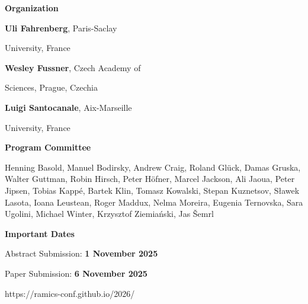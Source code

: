 \documentclass[a3paper, 12pt]{article}
\begin{document}
\begin{minipage}[t]{.43\linewidth}


  

  \vspace*{2ex}
  
  \hfill {\Large \bf Organization}

  \smallskip

  \hfill \textbf{Uli Fahrenberg}, Paris-Saclay

  \hfill University, France

  \hfill \textbf{Wesley Fussner}, Czech Academy of

  \hfill Sciences, Prague, Czechia

  \hfill \textbf{Luigi Santocanale}, Aix-Marseille

  \hfill University, France

  \bigskip

  \hfill {\Large \bf Program Committee}

  \medskip

Henning Basold,
Manuel Bodirsky,
Andrew Craig,
Roland Glück,
Damas Gruska,
Walter Guttman,
Robin Hirsch,
Peter Höfner,
Marcel Jackson,
Ali Jaoua,
Peter Jipsen,
Tobias Kappé,
Bartek Klin,
Tomasz Kowalski,
Stepan Kuznetsov,
Sławek Lasota,
Ioana Leustean,
Roger Maddux,
Nelma Moreira,
Eugenia Ternovska,
Sara Ugolini,
Michael Winter,
Krzysztof Ziemiański,
Jas Šemrl
  
  \bigskip
  
  \hfill
  {\Large \bf Important Dates}

  \smallskip

  \hfill Abstract Submission: \textbf{1 November 2025}
  
  \hfill Paper Submission: \textbf{6 November 2025}
  


  \vspace{8ex}

  \hspace*{-15ex} {\fontsize{30}{40}\selectfont https://ramics-conf.github.io/2026/}

  \vspace*{-2ex}

\end{minipage}
\end{document}
